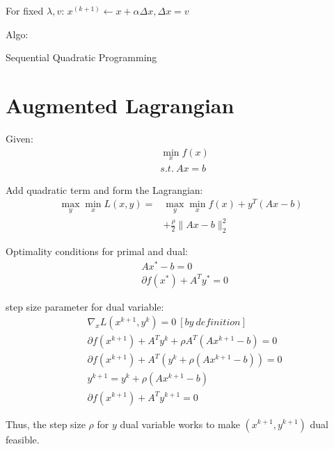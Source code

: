 \documentclass[8pt]{extarticle}
\newcommand{\norm}[1]{\|#1\|}
\begin{document}
\begin{multicols*}{2}
  For fixed $\lambda, v$: $x^{(k+1)} \leftarrow x + \alpha \Delta x, \Delta x = v$
  
  Algo:\\
  \begin{algorithm}[H]
    \caption{Sequential Quadratic Programming\label{algo:SQP}}
  \end{algorithm}
  
  \vfill\null
  
  \pagebreak

  \section{Augmented Lagrangian}

  Given:
  \begin{align*}
    & \min_x f(x)\\
    & s.t.\ Ax = b
  \end{align*}

  Add quadratic term and form the Lagrangian:
  \begin{align*}
    \max_y \min_x L(x,y) = & \max_y \min_x f(x) + y^T(Ax-b)\\
                           & + \frac{\rho}{2}\norm{Ax-b}_2^2
  \end{align*}

  Optimality conditions for primal and dual:
  \begin{align*}
    & Ax^* - b = 0\\
    & \partial f(x^*) + A^Ty^* = 0
  \end{align*}

  step size parameter for dual variable:
  \begin{align*}
    &\nabla_x L(x^{k+1},y^k) = 0\ [by\ definition]\\
    &\partial f(x^{k+1}) + A^T y^k + \rho A^T(Ax^{k+1}-b)=0\\
    &\partial f(x^{k+1}) + A^T( y^k + \rho(Ax^{k+1}-b))=0\\
    &y^{k+1} = y^k + \rho(Ax^{k+1}-b)\\
    &\partial f(x^{k+1}) + A^T y^{k+1}=0
  \end{align*}

  Thus, the step size $\rho$ for $y$ dual variable works to make $(x^{k+1}, y^{k+1})$ dual feasible.


\end{multicols*}
\end{document}
